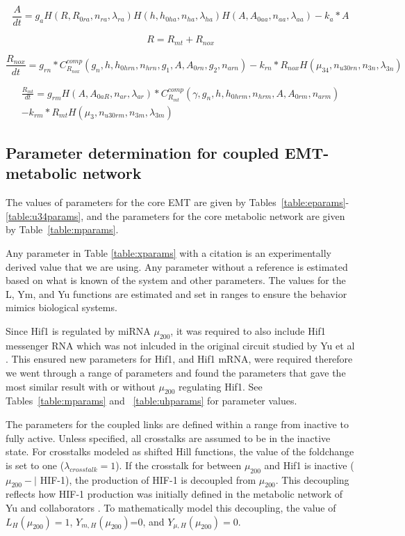 \documentclass{article}
\begin{document}
\begin{equation}
\frac{A}{dt}= g_a H(R,R_{0ra},n_{ra}, \lambda_{ra}) H(h, h_{0ha},n_{ha}, \lambda_{ha}) H(A, A_{0aa},n_{aa}, \lambda_{aa})-k_a*A
\end{equation}

\begin{equation}
R = R_{mt}+R_{nox}
\end{equation}

\begin{equation}
        \frac{R_{nox}}{dt}= g_{rn}*C^{comp}_{R_{nox}}(g_n,h,h_{0hrn},n_{hrn}, g_1,A,A_{0rn},g_2,n_{arn})-k_{rn}*R_{nox} H(\mu_{34}, n_{u30rn}, n_{3n}, \lambda_{3n})
\end{equation}

\begin{multline}
\frac{R_{mt}}{dt}= g_{rm} H(A,A_{0aR},n_{ar},\lambda_{ar})*C^{comp}_{R_{mt}}(\gamma,g_n,h,h_{0hrm},n_{hrm},A,A_{0rm}, n_{arm})\\-k_{rm}*R_{mt} H(\mu_3,n_{u30rm},n_{3m},\lambda_{3m})
\end{multline}




\subsection{Parameter determination for coupled EMT-metabolic network}
The values of parameters for the core EMT are given by Tables~\ref{table:eparams}-\ref{table:u34params}, and the parameters for the core metabolic network are given by Table~\ref{table:mparams}.

Any parameter in Table \ref{table:xparams} with a citation is an experimentally derived value that we are using. 
Any parameter without a reference is estimated based on what is known of the system and other parameters. 
The values for the L, Ym, and Yu functions are estimated and set in ranges to ensure the behavior mimics biological systems.

Since Hif1 is regulated by miRNA $\mu_{200}$, it was required to also include Hif1 messenger RNA which was not inlcuded in the original circuit studied by Yu et al \cite{Yu2017}. 
This ensured new parameters for Hif1, and Hif1 mRNA, were required therefore we went through a range of parameters and found the parameters that gave the most similar result with or without $\mu_{200}$ regulating Hif1. 
See Tables~\ref{table:mparams} and ~\ref{table:uhparams} for parameter values.

The parameters for the coupled links are defined within a range from inactive to fully active. 
Unless specified, all crosstalks are assumed to be in the inactive state. 
For crosstalks modeled as shifted Hill functions, the value of the foldchange is set to one ($\lambda_{crosstalk}=1$).
If the crosstalk for between $\mu_{200}$ and Hif1 is inactive ($\mu_{200}-|$ HIF-1), the production of HIF-1 is decoupled from $\mu_{200}$. 
This decoupling reflects how HIF-1 production was initially defined in the metabolic network of Yu and collaborators \cite{Yu2017}. 
To mathematically model this decoupling, the value of $L_H(\mu_{200})=1$, $Y_{m,H}(\mu_{200})$=0, and $Y_{\mu,H}(\mu_{200})=0$.
\end{document}
